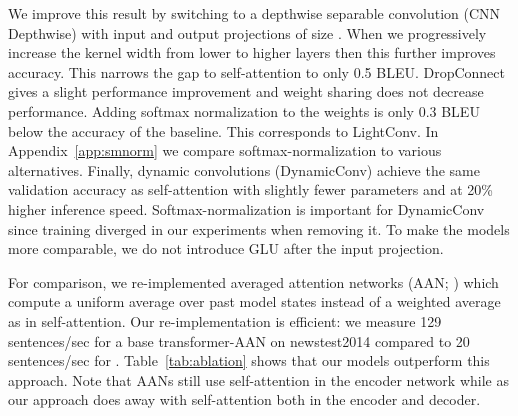 \documentclass{article} \usepackage{iclr2019_conference,times}
\def\sdconv{LightConv}
\def\tvsdconvfull{dynamic convolution}
\def\tvsdconv{DynamicConv}
\begin{document}
We improve this result by switching to a depthwise separable convolution (CNN Depthwise) with input and output projections of size . 
When we progressively increase the kernel width from lower to higher layers then this further improves accuracy. 
This narrows the gap to self-attention to only 0.5 BLEU.
DropConnect gives a slight performance improvement and weight sharing does not decrease performance.
Adding softmax normalization to the weights is only 0.3 BLEU below the accuracy of the baseline. 
This corresponds to \sdconv{}.
In Appendix~\ref{app:smnorm} we compare softmax-normalization to various alternatives.
Finally, \tvsdconvfull{}s (\tvsdconv{}) achieve the same validation accuracy as self-attention with slightly fewer parameters and at 20\% higher inference speed.
Softmax-normalization is important for \tvsdconv{} since training diverged in our experiments when removing it.
To make the models more comparable, we do not introduce GLU after the input projection.

For comparison, we re-implemented averaged attention networks (AAN; \citealt{zhang2018aan}) which compute a uniform average over past model states instead of a weighted average as in self-attention.
Our re-implementation is efficient: we measure 129 sentences/sec for a base transformer-AAN on newstest2014 compared to 20 sentences/sec for \citet{zhang2018aan}.
Table~\ref{tab:ablation} shows that our models outperform this approach.
Note that AANs still use self-attention in the encoder network while as our approach does away with self-attention both in the encoder and decoder.
\end{document}
